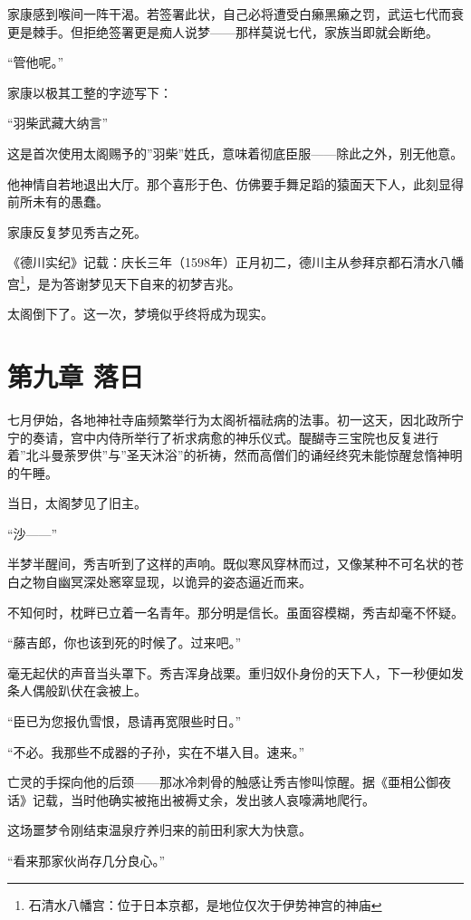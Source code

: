\documentclass[
]{article}
\begin{document}
家康感到喉间一阵干渴。若签署此状，自己必将遭受白癞黑癞之罚，武运七代而衰更是棘手。但拒绝签署更是痴人说梦------那样莫说七代，家族当即就会断绝。

``管他呢。''

家康以极其工整的字迹写下：

``羽柴武藏大纳言''

这是首次使用太阁赐予的''羽柴''姓氏，意味着彻底臣服------除此之外，别无他意。

他神情自若地退出大厅。那个喜形于色、仿佛要手舞足蹈的猿面天下人，此刻显得前所未有的愚蠢。

家康反复梦见秀吉之死。

《德川实纪》记载：庆长三年（1598年）正月初二，德川主从参拜京都石清水八幡宫\footnote{石清水八幡宫：位于日本京都，是地位仅次于伊势神宫的神庙}，是为答谢梦见天下自来的初梦吉兆。

太阁倒下了。这一次，梦境似乎终将成为现实。

\section*{第九章 落日}\label{ux7b2cux4e5dux7ae0-ux843dux65e5}

七月伊始，各地神社寺庙频繁举行为太阁祈福祛病的法事。初一这天，因北政所宁宁的奏请，宫中内侍所举行了祈求病愈的神乐仪式。醍醐寺三宝院也反复进行着''北斗曼荼罗供''与''圣天沐浴''的祈祷，然而高僧们的诵经终究未能惊醒怠惰神明的午睡。

当日，太阁梦见了旧主。

``沙------''

半梦半醒间，秀吉听到了这样的声响。既似寒风穿林而过，又像某种不可名状的苍白之物自幽冥深处窸窣显现，以诡异的姿态逼近而来。

不知何时，枕畔已立着一名青年。那分明是信长。虽面容模糊，秀吉却毫不怀疑。

``藤吉郎，你也该到死的时候了。过来吧。''

毫无起伏的声音当头罩下。秀吉浑身战栗。重归奴仆身份的天下人，下一秒便如发条人偶般趴伏在衾被上。

``臣已为您报仇雪恨，恳请再宽限些时日。''

``不必。我那些不成器的子孙，实在不堪入目。速来。''

亡灵的手探向他的后颈------那冰冷刺骨的触感让秀吉惨叫惊醒。据《亜相公御夜话》记载，当时他确实被拖出被褥丈余，发出骇人哀嚎满地爬行。

这场噩梦令刚结束温泉疗养归来的前田利家大为快意。

``看来那家伙尚存几分良心。''
\end{document}
